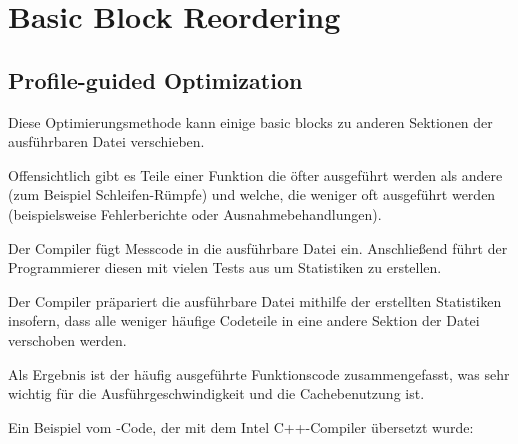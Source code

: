\section{Basic Block Reordering}


\subsection{Profile-guided Optimization}
\label{PGO}

\myindex{\oracle}

Diese Optimierungsmethode kann einige \gls{basic block}s zu anderen Sektionen der
ausführbaren Datei verschieben.

Offensichtlich gibt es Teile einer Funktion die öfter ausgeführt werden als andere
(zum Beispiel Schleifen-Rümpfe) und welche, die weniger oft ausgeführt werden
(beispielsweise Fehlerberichte oder Ausnahmebehandlungen).

Der Compiler fügt Messcode in die ausführbare Datei ein. Anschließend führt der
Programmierer diesen mit vielen Tests aus um Statistiken zu erstellen.

Der Compiler präpariert die ausführbare Datei mithilfe der erstellten Statistiken
insofern, dass alle weniger häufige Codeteile in eine andere Sektion der Datei
verschoben werden.

Als Ergebnis ist der häufig ausgeführte Funktionscode zusammengefasst, was sehr
wichtig für die Ausführgeschwindigkeit und die Cachebenutzung ist.

Ein Beispiel vom \oracle-Code, der mit dem Intel C++-Compiler übersetzt wurde:


